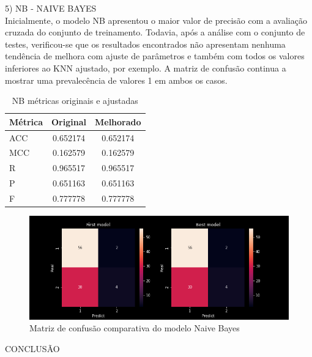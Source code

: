 \noindent \textcolor{deepblue}{5) NB - NAIVE BAYES}
\\

Inicialmente, o modelo NB apresentou o maior valor de precisão com a avaliação cruzada do conjunto de treinamento. Todavia, após a análise com o conjunto de testes, verificou-se que os resultados encontrados não apresentam nenhuma tendência de melhora com ajuste de parâmetros e também com todos os valores inferiores ao KNN ajustado, por exemplo. A matriz de confusão continua a mostrar uma prevalecência de valores 1 em ambos os casos.

\begin{table}[ht]
    \centering
    \begin{tabular}{lcc}
        \rowcolor{pagecolor!50!COLOR1}
        \hline
        Métrica & Original & Melhorado \\\hline\hline
        ACC     & 0.652174 & 0.652174  \\\hline
        MCC     & 0.162579 & 0.162579  \\\hline
        R       & 0.965517 & 0.965517  \\\hline
        P       & 0.651163 & 0.651163  \\\hline
        F       & 0.777778 & 0.777778
    \end{tabular}
    \caption{NB métricas originais e ajustadas}
\end{table}

\begin{figure}[H]
    \centering
    \includegraphics[width=\linewidth, scale=.6]{../../figuras/machine_learning/NB_MC.png}
    \caption{Matriz de confusão comparativa do modelo Naive Bayes}
\end{figure}


\noindent \textcolor{COLOR2}{CONCLUSÃO}
\\